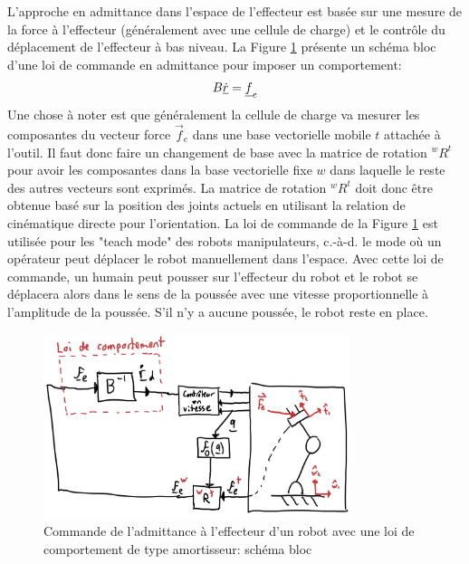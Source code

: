 L'approche en admittance dans l'espace de l'effecteur est basée sur une mesure de la force à l'effecteur (généralement avec une cellule de charge) et le contrôle du déplacement de l'effecteur à bas niveau. La Figure \ref{fig:admittancecontroltaskspace1} présente un schéma bloc d'une loi de commande en admittance pour imposer un comportement: %
\begin{align}
	B \underline{\dot{r}} = \underline{f}_e
\end{align}
Une chose à noter est que généralement la cellule de charge va mesurer les composantes du vecteur force $\Vec{f}_e$ dans une base vectorielle mobile $t$ attachée à l'outil. Il faut donc faire un changement de base avec la matrice de rotation ${}^{w}R^t$ pour avoir les composantes dans la base vectorielle fixe $w$ dans laquelle le reste des autres vecteurs sont exprimés. La matrice de rotation ${}^{w}R^t$ doit donc être obtenue basé sur la position des joints actuels en utilisant la relation de cinématique directe pour l'orientation. La loi de commande de la Figure \ref{fig:admittancecontroltaskspace1} est utilisée pour les "teach mode" des robots manipulateurs, c.-à-d. le mode où un opérateur peut déplacer le robot manuellement dans l'espace. Avec cette loi de commande, un humain peut pousser sur l'effecteur du robot et le robot se déplacera alors dans le sens de la poussée avec une vitesse proportionnelle à l'amplitude de la poussée. S’il n'y a aucune poussée, le robot reste en place.
\begin{figure}[h]
	\centering
	\includegraphics[width=0.80\textwidth]{fig/admittancecontroltaskspace1.jpg}
	\caption{Commande de l'admittance à l'effecteur d'un robot avec une loi de comportement de type amortisseur: schéma bloc}
	\label{fig:admittancecontroltaskspace1}
\end{figure}

